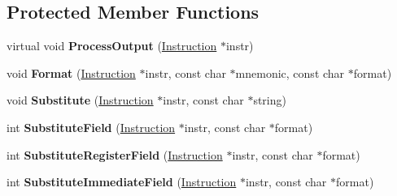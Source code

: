 \subsection*{Protected Member Functions}
\begin{DoxyCompactItemize}
\item 
virtual void {\bfseries Process\+Output} (\hyperlink{classv8_1_1internal_1_1_instruction}{Instruction} $\ast$instr)\hypertarget{classv8_1_1internal_1_1_disassembling_decoder_a6d4606cecb0c3de62249fca3c7754b45}{}\label{classv8_1_1internal_1_1_disassembling_decoder_a6d4606cecb0c3de62249fca3c7754b45}

\item 
void {\bfseries Format} (\hyperlink{classv8_1_1internal_1_1_instruction}{Instruction} $\ast$instr, const char $\ast$mnemonic, const char $\ast$format)\hypertarget{classv8_1_1internal_1_1_disassembling_decoder_a7613a666e4acf37f18b471d696160108}{}\label{classv8_1_1internal_1_1_disassembling_decoder_a7613a666e4acf37f18b471d696160108}

\item 
void {\bfseries Substitute} (\hyperlink{classv8_1_1internal_1_1_instruction}{Instruction} $\ast$instr, const char $\ast$string)\hypertarget{classv8_1_1internal_1_1_disassembling_decoder_a19663c822d13e5e7251dbf73cc95a457}{}\label{classv8_1_1internal_1_1_disassembling_decoder_a19663c822d13e5e7251dbf73cc95a457}

\item 
int {\bfseries Substitute\+Field} (\hyperlink{classv8_1_1internal_1_1_instruction}{Instruction} $\ast$instr, const char $\ast$format)\hypertarget{classv8_1_1internal_1_1_disassembling_decoder_accbbe90732e4d3251f853a649d5b41a0}{}\label{classv8_1_1internal_1_1_disassembling_decoder_accbbe90732e4d3251f853a649d5b41a0}

\item 
int {\bfseries Substitute\+Register\+Field} (\hyperlink{classv8_1_1internal_1_1_instruction}{Instruction} $\ast$instr, const char $\ast$format)\hypertarget{classv8_1_1internal_1_1_disassembling_decoder_a5c71f924ee011b47df430b3b0319df6b}{}\label{classv8_1_1internal_1_1_disassembling_decoder_a5c71f924ee011b47df430b3b0319df6b}

\item 
int {\bfseries Substitute\+Immediate\+Field} (\hyperlink{classv8_1_1internal_1_1_instruction}{Instruction} $\ast$instr, const char $\ast$format)\hypertarget{classv8_1_1internal_1_1_disassembling_decoder_a71a445eaf876a2786a72a235a54027cd}{}\label{classv8_1_1internal_1_1_disassembling_decoder_a71a445eaf876a2786a72a235a54027cd}


\end{DoxyCompactItemize}
